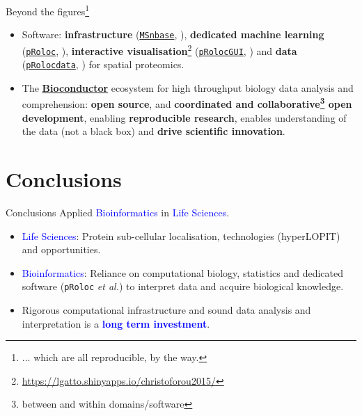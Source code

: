\documentclass{beamer}
\theoremstyle{example}
\begin{document}
\begin{frame}{}

  Beyond the figures\footnote{... which are all reproducible, by the way.}

  \begin{itemize}
  \item Software: \textbf{infrastructure}
    (\href{http://bioconductor.org/packages/MSnbase}{\texttt{MSnbase}},
    \cite{Gatto:2012}), \textbf{dedicated machine learning}
    (\href{http://bioconductor.org/packages/pRoloc}{\texttt{pRoloc}},
    \cite{Gatto:2014a}), \textbf{interactive
      visualisation}\footnote{\url{https://lgatto.shinyapps.io/christoforou2015/}}
    (\href{http://bioconductor.org/packages/pRolocGUI}{\texttt{pRolocGUI}},
    \cite{pRolocGUI}) and \textbf{data}
    (\href{http://bioconductor.org/packages/pRolocdata}{\texttt{pRolocdata}},
    \cite{Gatto:2014a}) for spatial proteomics.
  \item The \href{http://bioconductor.org/}{\textbf{Bioconductor}}
    \citep{Huber:2015} ecosystem for high throughput biology data
    analysis and comprehension: \textbf{open source}, and
    \textbf{coordinated and collaborative\footnote{between and within
        domains/software} open development}, enabling
    \textbf{reproducible research}, enables understanding of the data
    (not a black box) and \textbf{drive scientific innovation}.
  \end{itemize}
\end{frame}



\section{Conclusions}


\begin{frame}[fragile]{Conclusions}
  Applied \textcolor{Blue}{Bioinformatics} in \textcolor{Blue}{Life Sciences}.
  \bigskip
  \begin{itemize}
  \item \textcolor{Blue}{Life Sciences}: Protein sub-cellular
    localisation, technologies (hyperLOPIT) and opportunities.

  \item \textcolor{Blue}{Bioinformatics}: Reliance on computational
    biology, statistics and dedicated software (\texttt{pRoloc}
    \textit{et al.}) to interpret data and acquire biological
    knowledge.

  \item Rigorous computational infrastructure and sound data analysis
    and interpretation is a \textcolor{Blue}{\textbf{long term
        investment}}.

  \end{itemize}

\end{frame}
\end{document}
